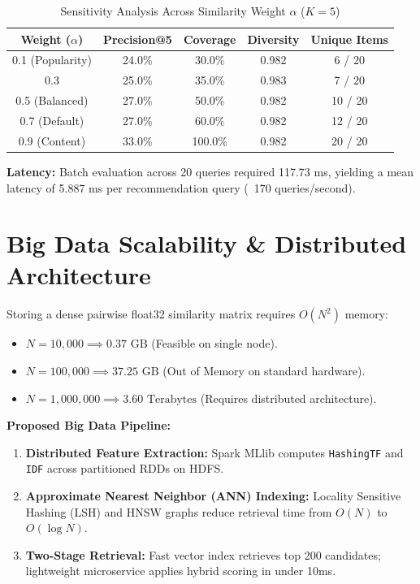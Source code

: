 \documentclass[conference]{IEEEtran}
\begin{document}
\begin{table}[htbp]
\caption{Sensitivity Analysis Across Similarity Weight $\alpha$ ($K=5$)}
\begin{center}
\begin{tabular}{ccccc}
\toprule
\textbf{Weight ($\alpha$)} & \textbf{Precision@5} & \textbf{Coverage} & \textbf{Diversity} & \textbf{Unique Items} \\
\midrule
0.1 (Popularity) & 24.0\% & 30.0\% & 0.982 & 6 / 20 \\
0.3 & 25.0\% & 35.0\% & 0.983 & 7 / 20 \\
0.5 (Balanced) & 27.0\% & 50.0\% & 0.982 & 10 / 20 \\
0.7 (Default) & 27.0\% & 60.0\% & 0.982 & 12 / 20 \\
0.9 (Content) & 33.0\% & 100.0\% & 0.982 & 20 / 20 \\
\bottomrule
\end{tabular}
\end{center}
\end{table}

\textbf{Latency:} Batch evaluation across 20 queries required 117.73 ms, yielding a mean latency of 5.887 ms per recommendation query (~170 queries/second).

\section{Big Data Scalability \& Distributed Architecture}
Storing a dense pairwise float32 similarity matrix requires $O(N^2)$ memory:
\begin{itemize}
    \item $N = 10,000 \implies 0.37 \text{ GB}$ (Feasible on single node).
    \item $N = 100,000 \implies 37.25 \text{ GB}$ (Out of Memory on standard hardware).
    \item $N = 1,000,000 \implies 3.60 \text{ Terabytes}$ (Requires distributed architecture).
\end{itemize}

\textbf{Proposed Big Data Pipeline:}
\begin{enumerate}
    \item \textbf{Distributed Feature Extraction:} Spark MLlib computes \texttt{HashingTF} and \texttt{IDF} across partitioned RDDs on HDFS.
    \item \textbf{Approximate Nearest Neighbor (ANN) Indexing:} Locality Sensitive Hashing (LSH) and HNSW graphs reduce retrieval time from $O(N)$ to $O(\log N)$.
    \item \textbf{Two-Stage Retrieval:} Fast vector index retrieves top 200 candidates; lightweight microservice applies hybrid scoring in under 10ms.
\end{enumerate}
\end{document}
